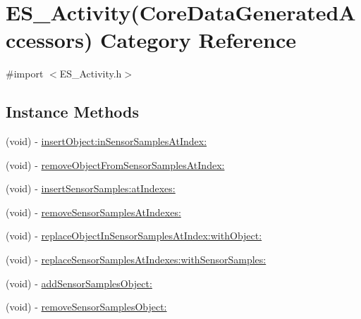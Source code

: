 \hypertarget{category_e_s___activity_07_core_data_generated_accessors_08}{\section{E\+S\+\_\+\+Activity(Core\+Data\+Generated\+Accessors) Category Reference}
\label{category_e_s___activity_07_core_data_generated_accessors_08}
}


{\ttfamily \#import $<$E\+S\+\_\+\+Activity.\+h$>$}

\subsection*{Instance Methods}
\begin{DoxyCompactItemize}
\item 
(void) -\/ \hyperlink{category_e_s___activity_07_core_data_generated_accessors_08_a4766cc019c128bf95fdd45244757ff31}{insert\+Object\+:in\+Sensor\+Samples\+At\+Index\+:}
\item 
(void) -\/ \hyperlink{category_e_s___activity_07_core_data_generated_accessors_08_a565963029b66ca8274ce9c3fb4fec6da}{remove\+Object\+From\+Sensor\+Samples\+At\+Index\+:}
\item 
(void) -\/ \hyperlink{category_e_s___activity_07_core_data_generated_accessors_08_af8a4906c606dcb733db9e00293d2c38d}{insert\+Sensor\+Samples\+:at\+Indexes\+:}
\item 
(void) -\/ \hyperlink{category_e_s___activity_07_core_data_generated_accessors_08_a4c2271af8fc94b9b3fc5227500c48627}{remove\+Sensor\+Samples\+At\+Indexes\+:}
\item 
(void) -\/ \hyperlink{category_e_s___activity_07_core_data_generated_accessors_08_a70053334ab83b38f8afb6c7ebdf92c54}{replace\+Object\+In\+Sensor\+Samples\+At\+Index\+:with\+Object\+:}
\item 
(void) -\/ \hyperlink{category_e_s___activity_07_core_data_generated_accessors_08_a8bffc9fbc9ff0b33b38b188cedbd4fbe}{replace\+Sensor\+Samples\+At\+Indexes\+:with\+Sensor\+Samples\+:}
\item 
(void) -\/ \hyperlink{category_e_s___activity_07_core_data_generated_accessors_08_ab0c48dd846438c6c4f0e095b200711c5}{add\+Sensor\+Samples\+Object\+:}
\item 
(void) -\/ \hyperlink{category_e_s___activity_07_core_data_generated_accessors_08_ab964a0a4c3a0862bad80233b59fe7328}{remove\+Sensor\+Samples\+Object\+:}

\end{DoxyCompactItemize}
